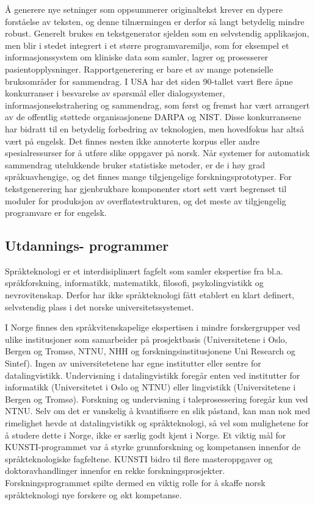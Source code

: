 \begin{multicols}{2}
Å generere nye setninger som oppsummerer originaltekst krever en dypere forståelse av teksten, og denne tilnærmingen er derfor så langt betydelig mindre robust. Generelt brukes en tekstgenerator sjelden som en selvstendig applikasjon, men blir i stedet integrert i et større programvaremiljø, som for eksempel et informasjonssystem om kliniske data som samler, lagrer og prosesserer pasientopplysninger. Rapportgenerering er bare et av mange potensielle bruksområder for sammendrag.
I USA har det siden 90-tallet vært flere åpne konkurranser i besvarelse av spørsmål eller dialogsystemer, informasjonsekstrahering og sammendrag, som først og fremst har vært arrangert av de offentlig støttede organisasjonene DARPA og NIST. Disse konkurransene har bidratt til en betydelig forbedring av teknologien, men hovedfokus har altså vært på engelsk. 
Det finnes nesten ikke annoterte korpus eller andre spesialressurser for å utføre slike oppgaver på norsk. 
Når systemer for automatisk sammendrag utelukkende bruker statistiske metoder, er de i høy grad språkuavhengige, og det finnes mange tilgjengelige forskningsprototyper. 
For tekstgenerering har gjenbrukbare komponenter stort sett vært begrenset til moduler for produksjon av overflatestrukturen, og det meste av tilgjengelig programvare er for engelsk. 

\subsection[Utdanningsprogramme]{Utdannings- programmer}

Språkteknologi er et interdisiplinært fagfelt som samler ekspertise fra bl.a. språkforskning, informatikk, matematikk, filosofi, psykolingvistikk og nevrovitenskap.
Derfor har ikke språkteknologi fått etablert en klart definert, selvstendig plass i det norske universitetssystemet. 


I Norge finnes den språkvitenskapelige ekspertisen i mindre forskergrupper ved ulike institusjoner som samarbeider på prosjektbasis (Universitetene i Oslo, Bergen og Tromsø, NTNU, NHH og forskningsinstitusjonene Uni Research og Sintef). Ingen av universitetetene har egne institutter eller sentre for datalingvistikk. Undervisning i datalingvistikk foregår enten ved institutter for informatikk (Universitetet i Oslo og NTNU) eller lingvistikk (Universitetene i Bergen og Tromsø). Forskning og undervisning i taleprosessering foregår kun ved NTNU. Selv om det er vanskelig å kvantifisere en slik påstand, kan man nok med rimelighet hevde at datalingvistikk og språkteknologi, så vel som mulighetene for å studere dette i Norge, ikke er særlig godt kjent i Norge. Et viktig mål for KUNSTI-programmet var å styrke grunnforskning og kompetansen innenfor de språkteknologiske fagfeltene. KUNSTI bidro til flere masteroppgaver og doktoravhandlinger innenfor en rekke forskningsprosjekter. Forskningsprogrammet spilte dermed en viktig rolle for å skaffe norsk språkteknologi nye forskere og økt kompetanse.


\end{multicols}
